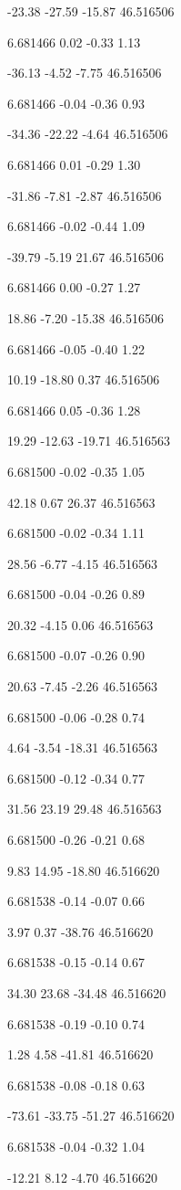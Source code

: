 -23.38
-27.59
-15.87
46.516506

6.681466
0.02
-0.33
1.13

-36.13
-4.52
-7.75
46.516506

6.681466
-0.04
-0.36
0.93

-34.36
-22.22
-4.64
46.516506

6.681466
0.01
-0.29
1.30

-31.86
-7.81
-2.87
46.516506

6.681466
-0.02
-0.44
1.09

-39.79
-5.19
21.67
46.516506

6.681466
0.00
-0.27
1.27

18.86
-7.20
-15.38
46.516506

6.681466
-0.05
-0.40
1.22

10.19
-18.80
0.37
46.516506

6.681466
0.05
-0.36
1.28

19.29
-12.63
-19.71
46.516563

6.681500
-0.02
-0.35
1.05

42.18
0.67
26.37
46.516563

6.681500
-0.02
-0.34
1.11

28.56
-6.77
-4.15
46.516563

6.681500
-0.04
-0.26
0.89

20.32
-4.15
0.06
46.516563

6.681500
-0.07
-0.26
0.90

20.63
-7.45
-2.26
46.516563

6.681500
-0.06
-0.28
0.74

4.64
-3.54
-18.31
46.516563

6.681500
-0.12
-0.34
0.77

31.56
23.19
29.48
46.516563

6.681500
-0.26
-0.21
0.68

9.83
14.95
-18.80
46.516620

6.681538
-0.14
-0.07
0.66

3.97
0.37
-38.76
46.516620

6.681538
-0.15
-0.14
0.67

34.30
23.68
-34.48
46.516620

6.681538
-0.19
-0.10
0.74

1.28
4.58
-41.81
46.516620

6.681538
-0.08
-0.18
0.63

-73.61
-33.75
-51.27
46.516620

6.681538
-0.04
-0.32
1.04

-12.21
8.12
-4.70
46.516620

